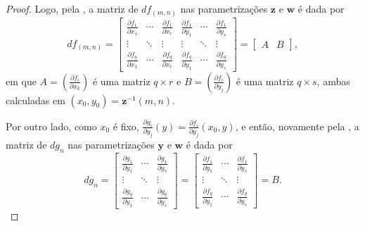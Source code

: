 \begin{lemma}
\begin{proof}
			Logo, pela , a matriz de $df_{(m,n)}$ nas parametrizações $\mathbf{z}$ e $\mathbf{w}$ é dada por
			\begin{equation*}
				df_{(m,n)} = \begin{bmatrix}
					\frac{\partial f_1}{\partial x_1} & \cdots & \frac{\partial f_1}{\partial x_r} & \frac{\partial f_1}{\partial y_1} & \cdots & \frac{\partial f_1}{\partial y_s} \\
					\vdots                            & \ddots & \vdots                            & \vdots                            & \ddots & \vdots                            \\
					\frac{\partial f_q}{\partial x_1} & \cdots & \frac{\partial f_q}{\partial x_r} & \frac{\partial f_q}{\partial y_1} & \cdots & \frac{\partial f_q}{\partial y_s}
				\end{bmatrix}
				= \begin{bmatrix} A & B \end{bmatrix},
			\end{equation*}
			em que $A=\left(\frac{\partial f_i}{\partial x_k}\right)$ é uma matriz $q\times r$ e $B=\left(\frac{\partial f_i}{\partial y_j}\right)$ é uma matriz $q\times s$, ambas calculadas em $(x_0,y_0)=\mathbf{z}^{-1}(m,n)$.

			Por outro lado, como $x_0$ é fixo, $\frac{\partial g_i}{\partial y_j}(y)=\frac{\partial f_i}{\partial y_j}(x_0,y)$, e então, novamente pela , a matriz de $dg_n$ nas parametrizações $\mathbf{y}$ e $\mathbf{w}$ é dada por
			\begin{equation*}
				dg_{n} = \begin{bmatrix}
					\frac{\partial g_1}{\partial y_1} & \cdots & \frac{\partial g_1}{\partial y_s} \\
					\vdots                            & \ddots & \vdots                            \\
					\frac{\partial g_q}{\partial y_1} & \cdots & \frac{\partial g_q}{\partial y_s}
				\end{bmatrix}
				= \begin{bmatrix}
					\frac{\partial f_1}{\partial y_1} & \cdots & \frac{\partial f_1}{\partial y_s} \\
					\vdots                            & \ddots & \vdots                            \\
					\frac{\partial f_q}{\partial y_1} & \cdots & \frac{\partial f_q}{\partial y_s}
				\end{bmatrix}
				= B.
			\end{equation*}


\end{proof}
\end{lemma}
